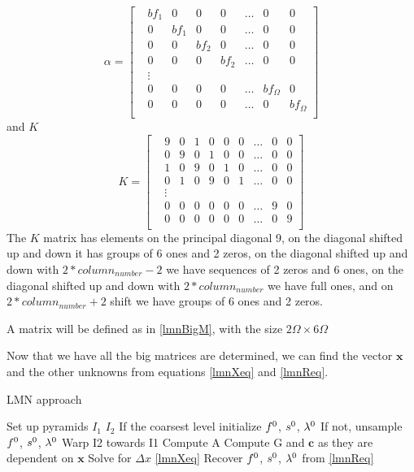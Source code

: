 \documentclass[12pt,a4paper,twoside]{report}
\begin{document}
{\begin{equation}
 \alpha = \begin{bmatrix}
 &	bf_1  & 0  & 0  & 0  & \ldots & 0  & 0 \\
 &	0  & bf_1  & 0  & 0  & \ldots & 0  & 0 \\
 &			0  & 0  & bf_2  & 0  & \ldots & 0  & 0\\
 &				0  & 0  & 0  & bf_2  & \ldots & 0  & 0\\
 &				\vdots\\
& 			0 & 0  & 0  & 0  &\ldots & bf_\Omega  & 0 \\
& 				0  & 0  & 0  & 0  &\ldots & 0  & bf_\Omega\\
 \end{bmatrix}
\end{equation}
and $K$
\begin{equation}
K = \begin{bmatrix}
&	9  & 0  & 1  & 0  & 0  & 0  & \ldots & 0  & 0 \\
&	0  & 9  & 0  & 1  & 0  & 0  & \ldots & 0  & 0 \\
&	1  & 0  & 9  & 0  & 1  & 0  &\ldots & 0  & 0\\
&	0  & 1  & 0  & 9  & 0  & 1  &\ldots & 0  & 0\\
&	\vdots\\
& 	0 & 0  & 0  & 0  & 0  & 0  &\ldots &9  & 0 \\
& 	0  & 0  & 0  & 0  & 0  & 0  &\ldots & 0  & 9\\
\end{bmatrix}
\end{equation}
The $K$
 matrix has elements on the principal diagonal 9, on the diagonal shifted up and down it has groups of 6 ones and 2 zeros, on the diagonal shifted up and down with $2* column_{number}-2$ we have sequences of 2 zeros and 6 ones, on the diagonal shifted up and down with  $2* column_{number}$ we have full ones, and on $2* column_{number}+2$  shift we have groups of 6 ones and 2 zeros.
  
  A matrix will be defined as in \ref{lmnBigM}, with the size $2\Omega \times 6\Omega$
 
 Now that we have all the big matrices are determined, we can find the vector $\boldsymbol{x}$  and the other unknowns from equations \ref{lmnXeq} and \ref{lmnReq}.  


\begin{algorithm}
	\caption{LMN approach}
	\label{CHalgorithm}
	\begin{algorithmic}[1]
		\State Set up pyramids $I_1$ $I_2$
		\State If the coarsest level initialize $\boldmath{f^0}$, $\boldmath{s^0}$, $\boldmath{\lambda^0}$
		\State If not, unsample $\boldmath{f^0}$, $\boldmath{s^0}$, $\boldmath{\lambda^0}$
		\State Warp I2 towards I1
		\State Compute A
		\State Compute G and $\boldsymbol{c}$ as they are dependent on $\boldsymbol{x}$
		\State Solve for $\Delta x$ \ref{lmnXeq}
		\State Recover $\boldmath{f^0}$, $\boldmath{s^0}$, $\boldmath{\lambda^0}$ from \ref{lmnReq}
		\EndFor
		\EndFor
	\end{algorithmic}
\end{algorithm}


}
\end{document}
